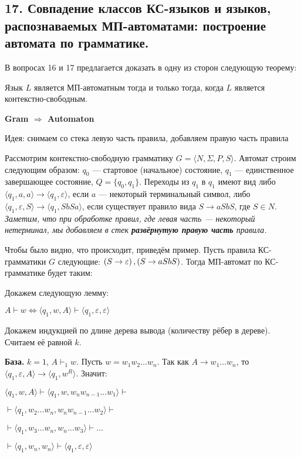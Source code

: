 \subsection{17. Совпадение классов КС-языков и языков, распознаваемых МП-автоматами: построение автомата по грамматике.}
В вопросах 16 и 17 предлагается доказать в одну из сторон следующую теорему:

\Th Язык $L$ является МП-автоматным тогда и только тогда, когда $L$ является контекстно-свободным.

\textbf{Gram $\Longrightarrow$ Automaton}

\noindent \Proof Идея: снимаем со стека левую часть правила, добавляем правую часть правила

Рассмотрим контекстно-свободную грамматику $G = \langle N, \Sigma, P, S \rangle$. Автомат строим следующим образом: $q_0$ — стартовое (начальное) состояние, $q_1$ — единственное завершающее состояние, $Q = \{ q_0, q_1 \}$. Переходы из $q_1$ в $q_1$ имеют вид либо $\langle q_1, a, a \rangle \rightarrow \langle q_1, \varepsilon \rangle$, если $a$ — некоторый терминальный символ, либо $\langle q_1, \varepsilon, S \rangle \rightarrow \langle q_1, SbSa \rangle$, если существует правило вида $S \rightarrow aSbS$, где $S \in N$. \textit{Заметим, что при обработке правил, где левая часть — некоторый нетерминал, мы добавляем в стек \textbf{развёрнутую правую часть} правила.}

Чтобы было видно, что происходит, приведём пример. Пусть правила КС-грамматики $G$ следующие: $\left({S \rightarrow \varepsilon}\right), \left({S \rightarrow aSbS}\right)$. Тогда МП-автомат по КС-грамматике будет таким:


Докажем следующую лемму:

\Lemma $A \vdash w \Longleftrightarrow \langle q_1, w, A \rangle \vdash \langle q_1, \varepsilon, \varepsilon \rangle$

\noindent Докажем индукцией по длине дерева вывода (количеству рёбер в дереве). Считаем её равной $k$.

\textbf{База.} $k = 1$, $A \vdash_1 w$. Пусть $w = w_1 w_2 \dots w_n$. Так как $A \rightarrow w_1 \dots w_n$, то $\langle q_1, \varepsilon, A \rangle \rightarrow \langle q_1, w^R \rangle$. Значит:

\begin{center}
    $\langle q_1, w, A \rangle \vdash \langle q_1, w, w_n w_{n - 1} \dots w_1 \rangle \vdash$
    
    $\vdash \langle q_1, w_2 \dots w_n, w_n w_{n - 1} \dots w_2 \rangle \vdash$
    
    $\vdash \langle q_1, w_3 \dots w_n, w_n \dots w_3 \rangle \vdash \dots$
    
    $\vdash \langle q_1, w_n, w_n \rangle \vdash \langle q_1, \varepsilon, \varepsilon \rangle$
\end{center}

